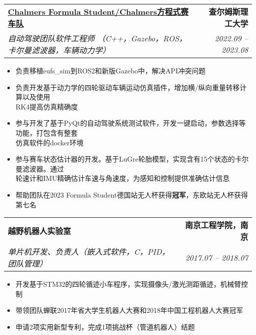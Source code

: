 \documentclass[letterpaper,11pt]{article}
\makeatletter
\newcommand{\resumeItem}[1]{
  \item\small{
    {#1 \vspace{-2pt}}
  }
}
\newcommand{\resumeSubheading}[4]{
  \vspace{-2pt}\item\small{
    \begin{tabular*}{0.97\textwidth}[t]{l@{\extracolsep{\fill}}r}
      \textbf{#1} & \textbf{#2} \\
      \textit{#3} & \textit{#4} \\
    \end{tabular*}\vspace{-7pt}
  }
}
\newcommand{\resumeItemListStart}{\begin{itemize}}
\newcommand{\resumeItemListEnd}{\end{itemize}\vspace{-5pt}}
\makeatother
\begin{document}
    \resumeSubheading
  {\href{https://www.chalmersformulastudent.se/cfs-2023-car-margareta}{Chalmers Formula Student/Chalmers方程式赛车队 \faExternalLink}}{查尔姆斯理工大学}
    {自动驾驶团队软件工程师 （C++，Gazebo，ROS，卡尔曼滤波器，车辆动力学）}{2022.09 -- 2023.08}
    \resumeItemListStart
      \resumeItem{负责移植eufs\_sim到ROS2和新版Gazebo中，解决API冲突问题}
      \resumeItem{负责开发基于动力学的四轮驱动车辆运动仿真插件，增加横/纵向重量转移计算以及使用 \\ RK4提高仿真精确度}
      \resumeItem{参与开发了基于PyQt的自动驾驶系统测试软件，开发一键启动，参数选择等功能，打包含有整套 \\ 仿真软件的docker环境}
      \resumeItem{参与赛车状态估计器的开发。基于LuGre轮胎模型，实现含有15个状态的卡尔曼滤波器。通过 \\ 轮速计和IMU精确估计车速与角速度，为感知和控制提供准确估计信息}
      \resumeItem{帮助团队在2023 Formula Student德国站无人杯获得\textbf{冠军}，东欧站无人杯获得第七名}
  \resumeItemListEnd


    
  \resumeSubheading
    {越野机器人实验室}{南京工程学院，南京}
    {单片机开发、负责人（嵌入式软件，C，PID，团队管理）}{2017.07 -- 2018.07}
    \resumeItemListStart
      \resumeItem{开发基于STM32的四轮循迹小车程序，实现摄像头/激光测距循迹，机械臂控制}
      \resumeItem{带领团队蝉联2017年省大学生机器人大赛和2018年中国工程机器人大赛冠军}
      \resumeItem{申请2项实用新型专利，完成1项挑战杯（管道机器人）结题}
      \resumeItemListEnd
\end{document}
